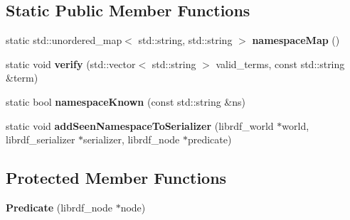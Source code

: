\subsection*{Static Public Member Functions}
\begin{DoxyCompactItemize}
\item 
\mbox{\label{classomexmeta_1_1Predicate_a1291e3cd9727871f568e864e0f5af3f0}} 
static std\+::unordered\+\_\+map$<$ std\+::string, std\+::string $>$ {\bfseries namespace\+Map} ()
\item 
\mbox{\label{classomexmeta_1_1Predicate_a1e7e59b8a48c9f89eeec73f3bbaea19c}} 
static void {\bfseries verify} (std\+::vector$<$ std\+::string $>$ valid\+\_\+terms, const std\+::string \&term)
\item 
\mbox{\label{classomexmeta_1_1Predicate_a8381c8b0c7bbaa27de29608cbff08bf5}} 
static bool {\bfseries namespace\+Known} (const std\+::string \&ns)
\item 
\mbox{\label{classomexmeta_1_1Predicate_a4cda551beb4e1354ac56d692f0eb78cd}} 
static void {\bfseries add\+Seen\+Namespace\+To\+Serializer} (librdf\+\_\+world $\ast$world, librdf\+\_\+serializer $\ast$serializer, librdf\+\_\+node $\ast$predicate)
\end{DoxyCompactItemize}
\subsection*{Protected Member Functions}
\begin{DoxyCompactItemize}
\item 
\mbox{\label{classomexmeta_1_1Predicate_a157c4e95f9869d4f22cd07332ff7621a}} 
{\bfseries Predicate} (librdf\+\_\+node $\ast$node)
\end{DoxyCompactItemize}
